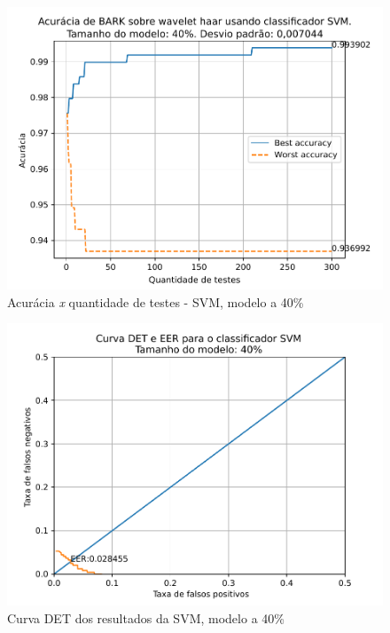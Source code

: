 			\begin{figure}[H]
				\centering
				\includegraphics[width=.9\linewidth]{images/results/confusionMatrices/classifier_SVM_40}
				\caption{Acurácia \textit{x} quantidade de testes - SVM, modelo a 40\%}
				\label{fig:classifiersvm40}
			\end{figure}
		
			\begin{figure}[H]
				\centering
				\includegraphics[width=.9\linewidth]{images/results/det/DET_for_classifier_SVM_40}
				\caption{Curva DET dos resultados da SVM, modelo a 40\%}
				\label{fig:detsvm40}
			\end{figure}

